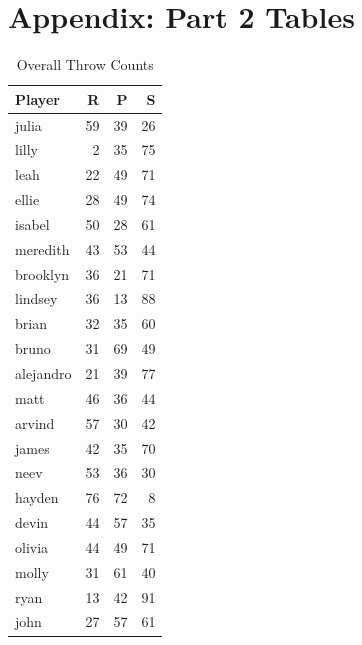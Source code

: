 \documentclass[12pt]{article}
\begin{document}
\newpage
\appendix
\section*{Appendix: Part 2 Tables}

\begin{multicols}{2}

\begin{table}[H]
\centering
\caption{Overall Throw Counts}
\label{tab:overall_counts}
\begin{tabular}{lrrr}
\toprule
\textbf{Player} & \textbf{R} & \textbf{P} & \textbf{S} \\
\midrule
julia & 59 & 39 & 26 \\
lilly & 2 & 35 & 75 \\
leah & 22 & 49 & 71 \\
ellie & 28 & 49 & 74 \\
isabel & 50 & 28 & 61 \\
meredith & 43 & 53 & 44 \\
brooklyn & 36 & 21 & 71 \\
lindsey & 36 & 13 & 88 \\
brian & 32 & 35 & 60 \\
bruno & 31 & 69 & 49 \\
alejandro & 21 & 39 & 77 \\
matt & 46 & 36 & 44 \\
arvind & 57 & 30 & 42 \\
james & 42 & 35 & 70 \\
neev & 53 & 36 & 30 \\
hayden & 76 & 72 & 8 \\
devin & 44 & 57 & 35 \\
olivia & 44 & 49 & 71 \\
molly & 31 & 61 & 40 \\
ryan & 13 & 42 & 91 \\
john & 27 & 57 & 61 \\
\bottomrule
\end{tabular}
\end{table}


\end{multicols}
\end{document}
